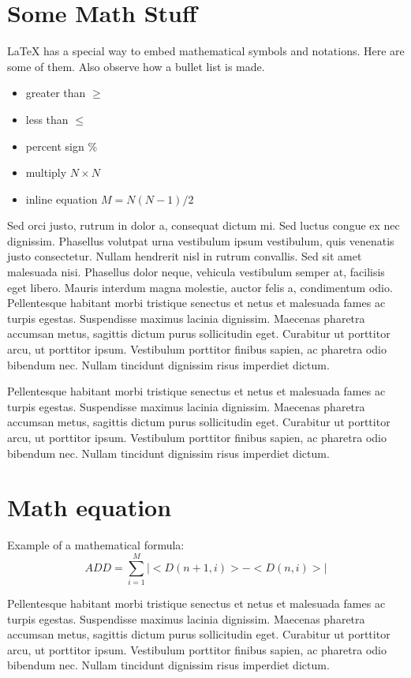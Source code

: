 \section{Some Math Stuff}
LaTeX{} has a special way to embed mathematical symbols and notations. Here are some of them. Also observe how a bullet list is made.
\begin{itemize}\itemsep0pt \parskip0pt 
\item greater than $\ge$
\item less than $\le$
\item percent sign \%
\item multiply $N\times N$
\item inline equation $M = N(N-1)/2$
\end{itemize}
Sed orci justo, rutrum in dolor a, consequat dictum mi. Sed luctus congue ex nec dignissim. Phasellus volutpat urna vestibulum ipsum vestibulum, quis venenatis justo consectetur. Nullam hendrerit nisl in rutrum convallis. Sed sit amet malesuada nisi. Phasellus dolor neque, vehicula vestibulum semper at, facilisis eget libero. Mauris interdum magna molestie, auctor felis a, condimentum odio. Pellentesque habitant morbi tristique senectus et netus et malesuada fames ac turpis egestas. Suspendisse maximus lacinia dignissim. Maecenas pharetra accumsan metus, sagittis dictum purus sollicitudin eget. Curabitur ut porttitor arcu, ut porttitor ipsum. Vestibulum porttitor finibus sapien, ac pharetra odio bibendum nec. Nullam tincidunt dignissim risus imperdiet dictum.

Pellentesque habitant morbi tristique senectus et netus et malesuada fames ac turpis egestas. Suspendisse maximus lacinia dignissim. Maecenas pharetra accumsan metus, sagittis dictum purus sollicitudin eget. Curabitur ut porttitor arcu, ut porttitor ipsum. Vestibulum porttitor finibus sapien, ac pharetra odio bibendum nec. Nullam tincidunt dignissim risus imperdiet dictum.
\section{Math equation}
Example of a mathematical formula:
\begin{equation}
  ADD = \sum_{i=1}^{M}|<D(n+1,i)>-<D(n,i)>|
  \label{add}
\end{equation}

Pellentesque habitant morbi tristique senectus et netus et malesuada fames ac turpis egestas. Suspendisse maximus lacinia dignissim. Maecenas pharetra accumsan metus, sagittis dictum purus sollicitudin eget. Curabitur ut porttitor arcu, ut porttitor ipsum. Vestibulum porttitor finibus sapien, ac pharetra odio bibendum nec. Nullam tincidunt dignissim risus imperdiet dictum.
